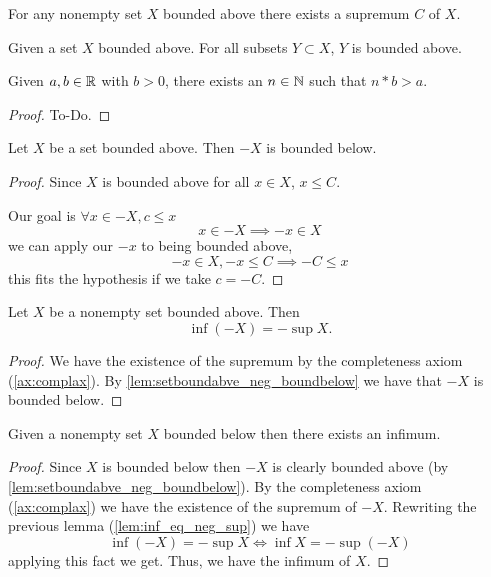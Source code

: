 \begin{axiom}\label{ax:complax}
   \leanok
  For any nonempty set $X$ bounded above there exists a supremum $C$ of $X$.
\end{axiom}

\begin{lemma}\label{lem:subsetboundbounded}
   \leanok
  Given a set $X$ bounded above.
  For all subsets $Y \subset X$,
  $Y$ is bounded above.
\end{lemma}

\begin{theorem}[Archimedes]\label{thm:archimedes}
   \leanok
  Given $a, b \in \mathbb{R}$ with $b > 0$,
  there exists an $n \in \mathbb{N}$ such that $n * b > a$.
\end{theorem}
\begin{proof}
  To-Do.
\end{proof}

\begin{lemma}\label{lem:setboundabve_neg_boundbelow}
   \leanok
  Let $X$ be a set bounded above.
  Then $-X$ is bounded below.
\end{lemma}
\begin{proof}
  Since $X$ is bounded above for all $x \in X$,
  $x \leq C$.

  Our goal is $\forall x \in -X, c \leq x$
  \[
  x \in -X \implies -x \in X
  \]
  we can apply our $-x$ to being bounded above,
  \[
  -x \in X, -x \leq C \implies -C \leq x
  \]
  this fits the hypothesis if we take $c = -C$.
\end{proof}

\begin{lemma}\label{lem:inf_eq_neg_sup}
    Let $X$ be a nonempty set bounded above.
    Then
    \[
    \inf(-X) = -\sup{X}.
    \]
\end{lemma}
\begin{proof}
    We have the existence of the supremum by the completeness axiom
    (\autoref{ax:complax}).
    By \autoref{lem:setboundabve_neg_boundbelow} we have that $-X$ is bounded below.
\end{proof}

\begin{lemma}\label{lem:existsinfimum}
  Given a nonempty set $X$ bounded below then there exists an infimum.
\end{lemma}
\begin{proof}
  Since $X$ is bounded below then $-X$ is clearly bounded above
  (by \autoref{lem:setboundabve_neg_boundbelow}).
  By the completeness axiom
  (\autoref{ax:complax})
  we have the existence of the supremum of $-X$.
  Rewriting the previous lemma
  (\autoref{lem:inf_eq_neg_sup})
  we have
  \[
  \inf(-X) = -\sup{X} \iff \inf{X} = -\sup(-X)
  \]
  applying this fact we get.
  Thus,
  we have the infimum of $X$.
\end{proof}